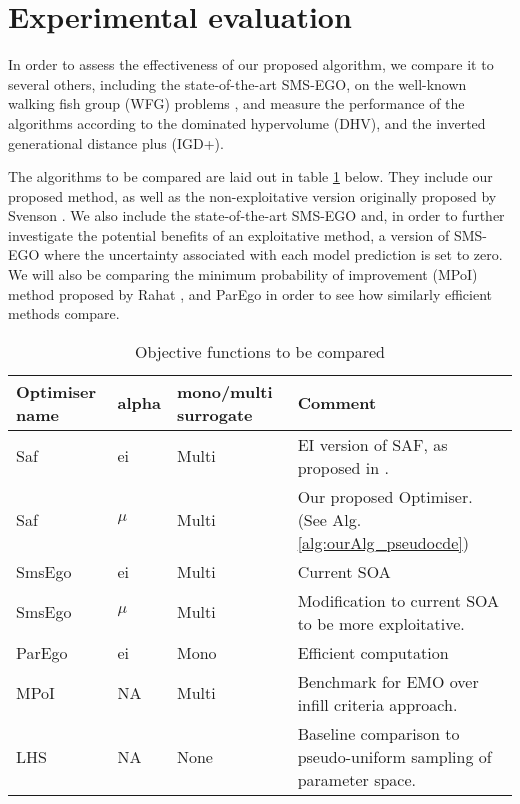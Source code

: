 \documentclass[runningheads]{llncs}
\begin{document}
\section{Experimental evaluation}
In order to assess the effectiveness of our proposed algorithm, we compare it to several others, including the state-of-the-art SMS-EGO, on the well-known walking fish group (WFG) problems \cite{huband2005scalable}, and measure the performance of the algorithms according to the dominated hypervolume (DHV), and the inverted generational distance plus (IGD+).

The algorithms to be compared are laid out in table \ref{table:alg_table} below. They include our proposed method, as well as the non-exploitative version originally proposed by Svenson \cite{svenson2016multiobjective}. We also include the state-of-the-art SMS-EGO and, in order to further investigate the potential benefits of an exploitative method, a version of SMS-EGO where the uncertainty  associated with each model prediction is set to zero. We will also be comparing the minimum probability of improvement (MPoI) method proposed by Rahat \cite{rahat2017alternative}, and ParEgo in order to see how similarly efficient methods compare.

\begin{table}
    \caption{Objective functions to be compared}\label{tab1}
    \label{table:alg_table}
    \begin{tabular}{|l|l|l|l|}
        \hline
        Optimiser name & alpha & mono/multi surrogate  & Comment\\
        \hline
        Saf & ei & Multi & EI version of SAF, as proposed in \cite{svenson2016multiobjective}. \\
        Saf & $\mu$ & Multi & Our proposed Optimiser. (See Alg. \ref{alg:ourAlg_pseudocde}) \\
        SmsEgo & ei & Multi & Current SOA \\
        SmsEgo & $\mu$ & Multi & Modification to current SOA to be more exploitative.\\
        ParEgo & ei & Mono & Efficient computation \\
        MPoI & NA & Multi & Benchmark for EMO over infill criteria approach. \\
        LHS & NA & None & Baseline comparison to pseudo-uniform sampling of parameter space. \\
        \hline
    \end{tabular}
\end{table}
\end{document}

